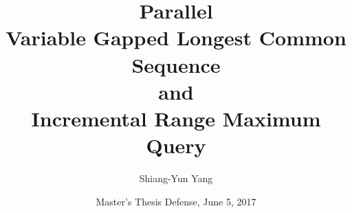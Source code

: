 \documentclass{beamer}
\title{Parallel \\
Variable Gapped Longest Common Sequence \\ and \\ 
Incremental Range Maximum Query}
\author{Shiang-Yun Yang}
\institute{Department of Computer Science \& Information Engineering\\
National Taiwan University}
\date{Master's Thesis Defense, June 5, 2017}
\begin{document}
\begin{frame}
    \titlepage
\end{frame}




%
%
%
%

%
\end{document}
